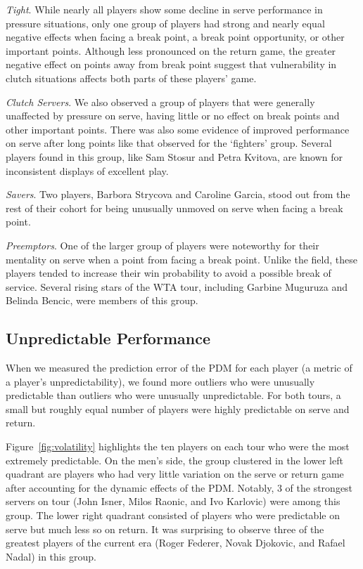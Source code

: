 \documentclass{Latex/svjour3}
\begin{document}
\textit{Tight}. While nearly all players show some decline in serve performance
in pressure situations, only one group of players had strong and nearly equal
negative effects when facing a break point, a break point opportunity, or other
important points.  Although less pronounced on the return game, the greater
negative effect on points away from break point suggest that vulnerability in
clutch situations affects both parts of these players' game.

\textit{Clutch Servers}. We also observed a group of players that were generally
unaffected by pressure on serve, having little or no effect on break points and
other important points. There was also some evidence of improved performance on
serve after long points like that observed for the `fighters' group. Several
players found in this group, like Sam Stosur and Petra Kvitova, are known for
inconsistent displays of excellent play.

\textit{Savers}. Two players, Barbora Strycova and Caroline Garcia, stood out
from the rest of their cohort for being unusually unmoved on serve when facing a
break point.

\textit{Preemptors}. One of the larger group of players were noteworthy for
their mentality on serve when a point from facing a break point. Unlike the
field, these players tended to increase their win probability to avoid a
possible break of service. Several rising stars of the WTA tour, including
Garbine Muguruza and Belinda Bencic, were members of this group.


\subsection{Unpredictable Performance}

When we measured the prediction error of the PDM for each player (a metric of a
player's unpredictability), we found more outliers who were unusually
predictable than outliers who were unusually unpredictable. For both tours, a
small but roughly equal number of players were highly predictable on serve and
return.

Figure~\ref{fig:volatility} highlights the ten players on each tour who were the
most extremely predictable. On the men's side, the group clustered in the lower
left quadrant are players who had very little variation on the serve or return
game after accounting for the dynamic effects of the PDM. Notably, 3 of the
strongest servers on tour (John Isner, Milos Raonic, and Ivo Karlovic) were
among this group. The lower right quadrant consisted of players who were
predictable on serve but much less so on return. It was surprising to observe
three of the greatest players of the current era (Roger Federer, Novak Djokovic,
and Rafael Nadal) in this group. 
\end{document}

